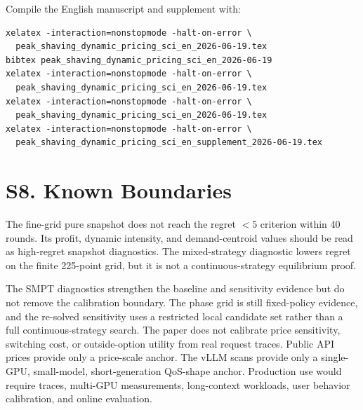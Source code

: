\documentclass[11pt,a4paper]{article}
\begin{document}
Compile the English manuscript and supplement with:

\begin{verbatim}
xelatex -interaction=nonstopmode -halt-on-error \
  peak_shaving_dynamic_pricing_sci_en_2026-06-19.tex
bibtex peak_shaving_dynamic_pricing_sci_en_2026-06-19
xelatex -interaction=nonstopmode -halt-on-error \
  peak_shaving_dynamic_pricing_sci_en_2026-06-19.tex
xelatex -interaction=nonstopmode -halt-on-error \
  peak_shaving_dynamic_pricing_sci_en_2026-06-19.tex
xelatex -interaction=nonstopmode -halt-on-error \
  peak_shaving_dynamic_pricing_sci_en_supplement_2026-06-19.tex
\end{verbatim}

\section*{S8. Known Boundaries}

The fine-grid pure snapshot does not reach the regret $<5$ criterion within
40 rounds. Its profit, dynamic intensity, and demand-centroid values should be
read as high-regret snapshot diagnostics. The mixed-strategy diagnostic lowers
regret on the finite 225-point grid, but it is not a continuous-strategy
equilibrium proof.

The SMPT diagnostics strengthen the baseline and sensitivity evidence but do not
remove the calibration boundary. The phase grid is still fixed-policy evidence,
and the re-solved sensitivity uses a restricted local candidate set rather than
a full continuous-strategy search. The paper does not calibrate price sensitivity,
switching cost, or outside-option utility from real request traces. Public API
prices provide only a price-scale anchor. The vLLM scans provide only a single-GPU,
small-model, short-generation QoS-shape anchor. Production use would require
traces, multi-GPU measurements, long-context workloads, user behavior calibration,
and online evaluation.
\end{document}

